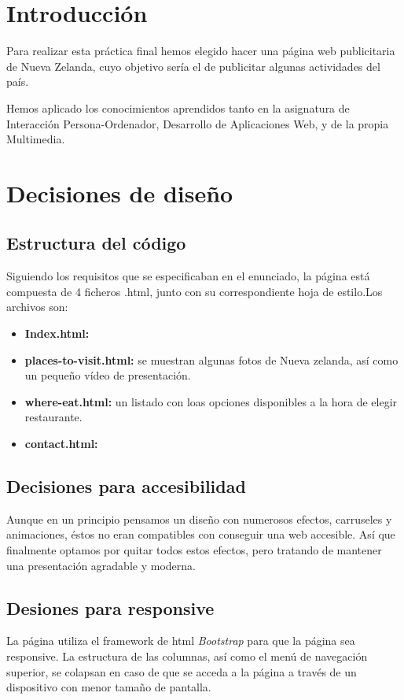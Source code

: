 \section{Introducción}
Para realizar esta práctica final hemos elegido hacer una página web publicitaria de Nueva Zelanda, cuyo objetivo sería el de publicitar algunas actividades del país.

Hemos aplicado los conocimientos aprendidos tanto en la asignatura de Interacción Persona-Ordenador, Desarrollo de Aplicaciones Web, y de la propia Multimedia.
\section{Decisiones de diseño}
\subsection{Estructura del código}
Siguiendo los requisitos que se especificaban en el enunciado, la página está compuesta de 4 ficheros .html, junto con su correspondiente hoja de estilo.Los archivos son:
\begin{itemize}
	\item \textbf{Index.html: }
	\item \textbf{places-to-visit.html: } se muestran algunas fotos de Nueva zelanda, así como un pequeño vídeo de presentación.
	\item \textbf{where-eat.html: }un listado con loas opciones disponibles a la hora de elegir restaurante.
	\item \textbf{contact.html: }
\end{itemize}

\subsection{Decisiones para accesibilidad}

Aunque en un principio pensamos un diseño con numerosos efectos, carruseles y animaciones, éstos no eran compatibles con conseguir una web accesible. Así que finalmente optamos por quitar todos estos efectos, pero tratando de mantener una presentación agradable y moderna.

\subsection{Desiones para responsive}
La página utiliza el framework de html \textit{Bootstrap} para que la página sea responsive. La estructura de las columnas, así como el menú de navegación superior, se colapsan en caso de que se acceda a la página a través de un dispositivo con menor tamaño de pantalla.
